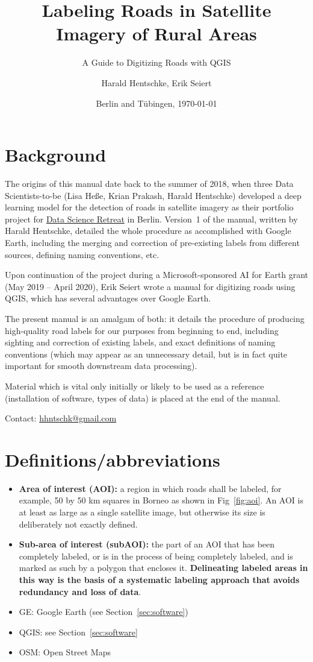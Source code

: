 \documentclass[12pt,a4paper]{scrartcl}
\title{Labeling Roads in Satellite Imagery of Rural Areas}
\subtitle{A Guide to Digitizing Roads with QGIS}
\author{Harald Hentschke, Erik Seiert}
\date{Berlin and Tübingen, \today{}}
\begin{document}
\maketitle
\newpage

\tableofcontents
\newpage

\section{Background} 
The origins of this manual date back to the summer of 2018, when three Data Scientists-to-be (Lisa He\ss e, Krian Prakash, Harald Hentschke) developed a deep learning model for the detection of roads in satellite imagery as their portfolio project for \href{https://www.datascienceretreat.com/}{Data Science Retreat} in Berlin. Version~1 of the manual, written by Harald Hentschke, detailed the whole procedure as accomplished with Google Earth, including the merging and correction of pre-existing labels from different sources, defining naming conventions, etc.

Upon continuation of the project during a Microsoft-sponsored AI for Earth grant (May 2019 -- April 2020), Erik Seiert wrote a manual for digitizing roads using QGIS, which has several advantages over Google Earth. 

The present manual is an amalgam of both: it details the procedure of producing high-quality road labels for our purposes from beginning to end, including sighting and correction of existing labels, and exact definitions of naming conventions (which may appear as an unnecessary detail, but is in fact quite important for smooth downstream data processing).

Material which is vital only initially or likely to be used as a reference (installation of software, types of data) is placed at the end of the manual.

Contact: \url{hhntschk@gmail.com}


\section{Definitions/abbreviations}
\begin{itemize}
	\item \textbf{Area of interest (AOI):} a region in which roads shall be labeled, for example, 50 by 50 km squares in Borneo as shown in Fig~\ref{fig:aoi}. An AOI is at least as large as a single satellite image, but otherwise its size is deliberately not exactly defined.
	\item \textbf{Sub-area of interest (subAOI):} the part of an AOI that has been completely labeled, or is in the process of being completely labeled, and is marked as such by a polygon that encloses it. \textbf{Delineating labeled areas in this way is the basis of a systematic labeling approach that avoids redundancy and loss of data}.
	\item GE: Google Earth (see Section~\ref{sec:software})
	\item QGIS: see Section~\ref{sec:software}
	\item OSM: Open Street Maps
\end{itemize}
\end{document}
